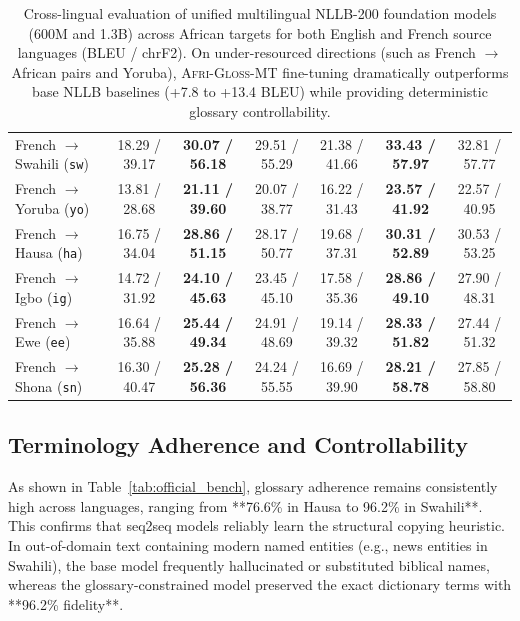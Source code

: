 \documentclass[10pt,twocolumn]{article}
\newcommand{\agm}{\textsc{Afri-Gloss-MT}}
\begin{document}
\begin{table}[t]
\begin{tabular}{lcccccc}
French $\rightarrow$ Swahili (\texttt{sw}) & 18.29 / 39.17 & \textbf{30.07 / 56.18} & 29.51 / 55.29 & 21.38 / 41.66 & \textbf{33.43 / 57.97} & 32.81 / 57.77 \\
French $\rightarrow$ Yoruba (\texttt{yo}) & 13.81 / 28.68 & \textbf{21.11 / 39.60} & 20.07 / 38.77 & 16.22 / 31.43 & \textbf{23.57 / 41.92} & 22.57 / 40.95 \\
French $\rightarrow$ Hausa (\texttt{ha}) & 16.75 / 34.04 & \textbf{28.86 / 51.15} & 28.17 / 50.77 & 19.68 / 37.31 & \textbf{30.31 / 52.89} & 30.53 / 53.25 \\
French $\rightarrow$ Igbo (\texttt{ig}) & 14.72 / 31.92 & \textbf{24.10 / 45.63} & 23.45 / 45.10 & 17.58 / 35.36 & \textbf{28.86 / 49.10} & 27.90 / 48.31 \\
French $\rightarrow$ Ewe (\texttt{ee}) & 16.64 / 35.88 & \textbf{25.44 / 49.34} & 24.91 / 48.69 & 19.14 / 39.32 & \textbf{28.33 / 51.82} & 27.44 / 51.32 \\
French $\rightarrow$ Shona (\texttt{sn}) & 16.30 / 40.47 & \textbf{25.28 / 56.36} & 24.24 / 55.55 & 16.69 / 39.90 & \textbf{28.21 / 58.78} & 27.85 / 58.80 \\
\bottomrule
\end{tabular}
\caption{Cross-lingual evaluation of unified multilingual NLLB-200 foundation models (600M and 1.3B) across African targets for both English and French source languages (BLEU / chrF2). On under-resourced directions (such as French $\rightarrow$ African pairs and Yoruba), \agm{} fine-tuning dramatically outperforms base NLLB baselines (+7.8 to +13.4 BLEU) while providing deterministic glossary controllability.}
\label{tab:nllb_bench}
\end{table}

\subsection{Terminology Adherence and Controllability}
As shown in Table~\ref{tab:official_bench}, glossary adherence remains consistently high across languages, ranging from **76.6\% in Hausa to 96.2\% in Swahili**. This confirms that seq2seq models reliably learn the structural copying heuristic. In out-of-domain text containing modern named entities (e.g., news entities in Swahili), the base model frequently hallucinated or substituted biblical names, whereas the glossary-constrained model preserved the exact dictionary terms with **96.2\% fidelity**.
\end{document}
